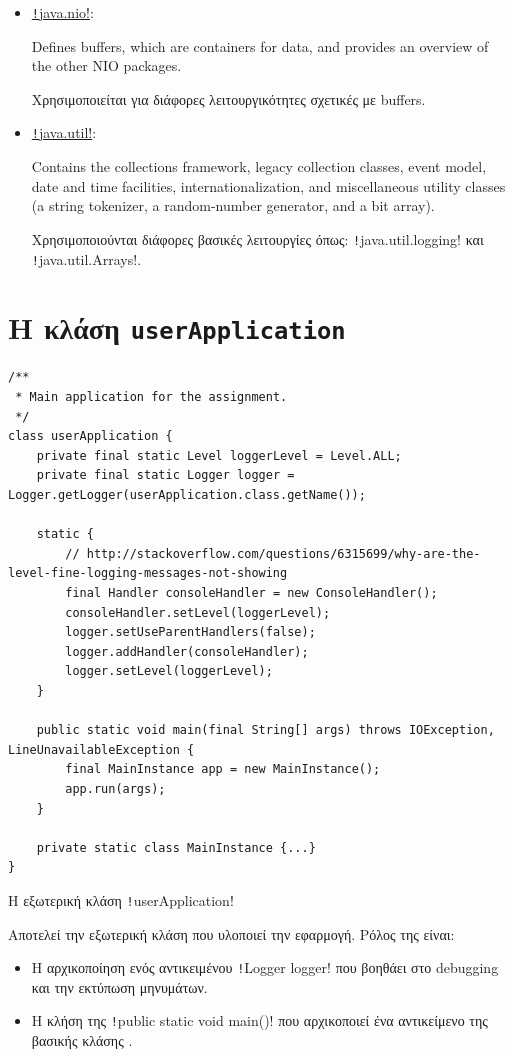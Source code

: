 \begin{itemize}
\item
\href{https://docs.oracle.com/javase/8/docs/api/java/nio/package-summary.html}{\texttt!java.nio!}:
\begin{displayquote}
Defines buffers, which are containers for data, and provides an overview of the other NIO packages.
\end{displayquote}
Χρησιμοποιείται για διάφορες λειτουργικότητες σχετικές με buffers.

\item
\href{https://docs.oracle.com/javase/8/docs/api/java/util/package-summary.html}{\texttt!java.util!}:
\begin{displayquote}
Contains the collections framework, legacy collection classes, event model, date and time facilities, internationalization, and miscellaneous utility classes (a string tokenizer, a random-number generator, and a bit array).
\end{displayquote}
\sloppy Χρησιμοποιούνται διάφορες βασικές λειτουργίες όπως:
\texttt!java.util.logging! και \texttt!java.util.Arrays!.
\end{itemize}

\section{Η κλάση \texttt{userApplication}}
\begin{code}
\begin{verbatim}
/**
 * Main application for the assignment.
 */
class userApplication {
    private final static Level loggerLevel = Level.ALL;
    private final static Logger logger = Logger.getLogger(userApplication.class.getName());

    static {
        // http://stackoverflow.com/questions/6315699/why-are-the-level-fine-logging-messages-not-showing
        final Handler consoleHandler = new ConsoleHandler();
        consoleHandler.setLevel(loggerLevel);
        logger.setUseParentHandlers(false);
        logger.addHandler(consoleHandler);
        logger.setLevel(loggerLevel);
    }

    public static void main(final String[] args) throws IOException, LineUnavailableException {
        final MainInstance app = new MainInstance();
        app.run(args);
    }

    private static class MainInstance {...}
}
\end{verbatim}
\caption{Η εξωτερική κλάση \texttt!userApplication!}
\end{code}
Αποτελεί την εξωτερική κλάση που υλοποιεί την εφαρμογή.
Ρόλος της είναι:
\begin{itemize}
\item Η αρχικοποίηση ενός αντικειμένου \texttt!Logger logger! που βοηθάει στο debugging και την εκτύπωση μηνυμάτων.
\item Η κλήση της \texttt!public static void main()! που αρχικοποιεί ένα αντικείμενο της βασικής κλάσης .
\end{itemize}
